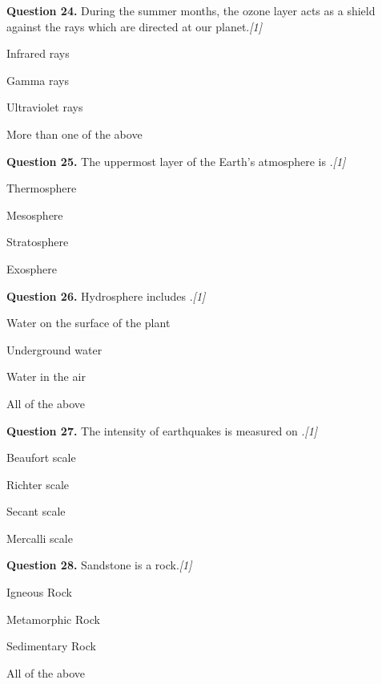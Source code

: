 \documentclass[11pt,a4paper]{article}
\newcommand{\pts}[1]{\hfill \textit{[#1]}}
\begin{document}
\medskip

\noindent \textbf{Question 24.} During the summer months, the ozone layer acts as a shield against the \underline{\hspace{2cm}} rays which are directed at our planet.\pts{1}
\begin{parts}
  \item Infrared rays
  \item Gamma rays
  \item Ultraviolet rays
  \item More than one of the above
\end{parts}

\medskip

\noindent \textbf{Question 25.} The uppermost layer of the Earth's atmosphere is \underline{\hspace{2cm}}.\pts{1}
\begin{parts}
  \item Thermosphere
  \item Mesosphere
  \item Stratosphere
  \item Exosphere
\end{parts}

\medskip

\noindent \textbf{Question 26.} Hydrosphere includes \underline{\hspace{2cm}}.\pts{1}
\begin{parts}
  \item Water on the surface of the plant
  \item Underground water
  \item Water in the air
  \item All of the above
\end{parts}

\medskip

\noindent \textbf{Question 27.} The intensity of earthquakes is measured on \underline{\hspace{2cm}}.\pts{1}
\begin{parts}
  \item Beaufort scale
  \item Richter scale
  \item Secant scale
  \item Mercalli scale
\end{parts}

\medskip

\noindent \textbf{Question 28.} Sandstone is a \underline{\hspace{2cm}} rock.\pts{1}
\begin{parts}
  \item Igneous Rock
  \item Metamorphic Rock
  \item Sedimentary Rock
  \item All of the above
\end{parts}
\end{document}
